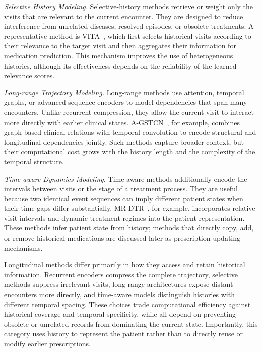 \documentclass[manuscript,review]{acmart}
\begin{document}
\textit{Selective History Modeling.} Selective-history methods retrieve or weight only the visits that are relevant to the current encounter. They are designed to reduce interference from unrelated diseases, resolved episodes, or obsolete treatments. A representative method is VITA~\cite{kim2024vita}, which first selects historical visits according to their relevance to the target visit and then aggregates their information for medication prediction. This mechanism improves the use of heterogeneous histories, although its effectiveness depends on the reliability of the learned relevance scores.

\textit{Long-range Trajectory Modeling.} Long-range methods use attention, temporal graphs, or advanced sequence encoders to model dependencies that span many encounters. Unlike recurrent compression, they allow the current visit to interact more directly with earlier clinical states. A-GSTCN~\cite{yueAGSTCNAugmentedGraph2023a}, for example, combines graph-based clinical relations with temporal convolution to encode structural and longitudinal dependencies jointly. Such methods capture broader context, but their computational cost grows with the history length and the complexity of the temporal structure.

\textit{Time-aware Dynamics Modeling.} Time-aware methods additionally encode the intervals between visits or the stage of a treatment process. They are useful because two identical event sequences can imply different patient states when their time gaps differ substantially. MR-DTR~\cite{li2025mrdtr}, for example, incorporates relative visit intervals and dynamic treatment regimes into the patient representation. These methods infer patient state from history; methods that directly copy, add, or remove historical medications are discussed later as prescription-updating mechanisms.

Longitudinal methods differ primarily in how they access and retain historical information. Recurrent encoders compress the complete trajectory, selective methods suppress irrelevant visits, long-range architectures expose distant encounters more directly, and time-aware models distinguish histories with different temporal spacing. These choices trade computational efficiency against historical coverage and temporal specificity, while all depend on preventing obsolete or unrelated records from dominating the current state. Importantly, this category uses history to represent the patient rather than to directly reuse or modify earlier prescriptions.
\end{document}
